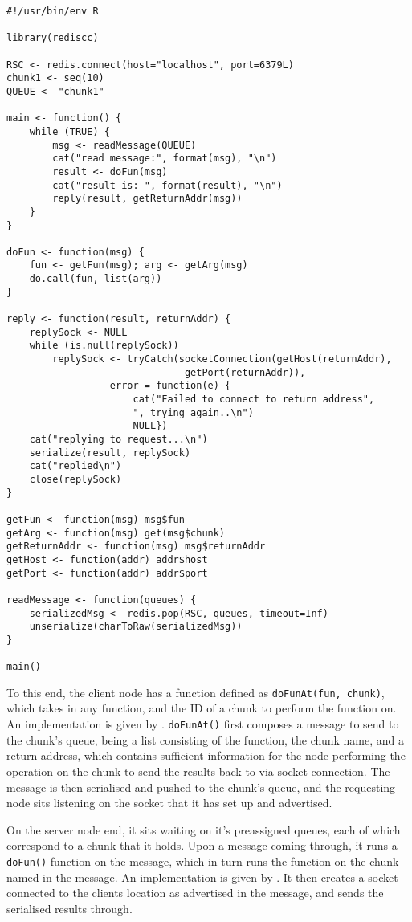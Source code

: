 \hypertarget{lst:vr-server}{%
\label{lst:vr-server}}%
\begin{verbatim}
#!/usr/bin/env R

library(rediscc)

RSC <- redis.connect(host="localhost", port=6379L)
chunk1 <- seq(10)
QUEUE <- "chunk1"

main <- function() {
    while (TRUE) {
        msg <- readMessage(QUEUE)
        cat("read message:", format(msg), "\n")
        result <- doFun(msg)
        cat("result is: ", format(result), "\n")
        reply(result, getReturnAddr(msg))
    }
}

doFun <- function(msg) {
    fun <- getFun(msg); arg <- getArg(msg)
    do.call(fun, list(arg))
}

reply <- function(result, returnAddr) {
    replySock <- NULL
    while (is.null(replySock))
        replySock <- tryCatch(socketConnection(getHost(returnAddr),
                               getPort(returnAddr)),
                  error = function(e) {
                      cat("Failed to connect to return address",
                      ", trying again..\n")
                      NULL})
    cat("replying to request...\n")
    serialize(result, replySock)
    cat("replied\n")
    close(replySock)
}

getFun <- function(msg) msg$fun
getArg <- function(msg) get(msg$chunk)
getReturnAddr <- function(msg) msg$returnAddr
getHost <- function(addr) addr$host
getPort <- function(addr) addr$port

readMessage <- function(queues) {
    serializedMsg <- redis.pop(RSC, queues, timeout=Inf)
    unserialize(charToRaw(serializedMsg))
}

main()
\end{verbatim}

To this end, the client node has a function defined as
\texttt{doFunAt(fun,\ chunk)}, which takes in any function, and the ID
of a chunk to perform the function on. An implementation is given by
\cite{lst:vr-client}. \texttt{doFunAt()} first composes a message to
send to the chunk's queue, being a list consisting of the function, the
chunk name, and a return address, which contains sufficient information
for the node performing the operation on the chunk to send the results
back to via socket connection. The message is then serialised and pushed
to the chunk's queue, and the requesting node sits listening on the
socket that it has set up and advertised.

On the server node end, it sits waiting on it's preassigned queues, each
of which correspond to a chunk that it holds. Upon a message coming
through, it runs a \texttt{doFun()} function on the message, which in
turn runs the function on the chunk named in the message. An
implementation is given by \cite{lst:vr-server}. It then creates a
socket connected to the clients location as advertised in the message,
and sends the serialised results through.

